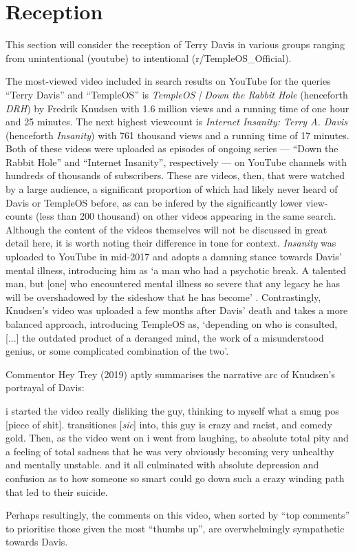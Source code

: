 \documentclass[Draft.tex]{subfiles}
\begin{document}
\section*{Reception}
This section will consider the reception of Terry Davis in various groups
ranging from unintentional (youtube) to intentional (r/TempleOS\_Official).

The most-viewed video included in search results on YouTube
for the queries ``Terry Davis'' and ``TempleOS'' is
\textit{TempleOS | Down the Rabbit Hole} (henceforth \textit{DRH})
by Fredrik Knudsen with 1.6 million views
and a running time of one hour and 25 minutes.
The next highest viewcount is \textit{Internet Insanity: Terry A. Davis}
(henceforth \textit{Insanity}) with 761 thousand views and a running time of 17 minutes.
Both of these videos were uploaded as episodes of ongoing series
--- ``Down the Rabbit Hole'' and ``Internet Insanity'', respectively ---
on YouTube channels with hundreds of thousands of subscribers.
These are videos, then, that were watched by a large audience,
a significant proportion of which had likely never heard of Davis
or TempleOS before, as can be infered
by the significantly lower view-counts (less than 200 thousand)
on other videos appearing in the same search.
Although the content of the videos themselves
will not be discussed in great detail here,
it is worth noting their difference in tone for context.
\textit{Insanity} was uploaded to YouTube in mid-2017 and adopts a damning stance
towards Davis' mental illness, introducing him as
`a man who had a psychotic break.
A talented man, but [one] who encountered mental illness so severe
that any legacy he has will be overshadowed
by the sideshow that he has become' \parencite*{Metokur17}.
Contrastingly, Knudsen's \parencite*{Knudsen18} video
was uploaded a few months after Davis' death and
takes a more balanced approach, introducing TempleOS as,
`depending on who is consulted, [...] the outdated product of a deranged mind,
the work of a misunderstood genius, or some complicated combination of the two'.

Commentor Hey Trey (2019) aptly summarises
the narrative arc of Knudsen's portrayal of Davis:
\begin{displayquote}
	i started the video really disliking the guy,
	thinking to myself what a smug pos [piece of shit].
	transitiones [\textit{sic}] into, this guy is crazy and racist, and comedy gold.
	Then, as the video went on i went from laughing, to absolute total pity
	and a feeling of total sadness that he was very obviously
	becoming very unhealthy and mentally unstable.
	and it all culminated with absolute depression and confusion as to
	how someone so smart could go down such a crazy winding path
	that led to their suicide.
\end{displayquote}
Perhaps resultingly, the comments on this video, when sorted by ``top comments''
to prioritise those given the most ``thumbs up'',
are overwhelmingly sympathetic towards Davis.
\end{document}
